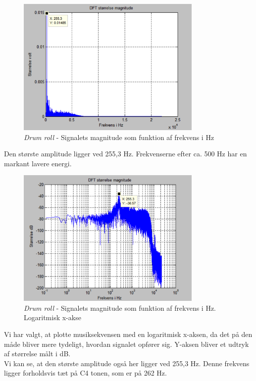 \begin{figure}[H]
	\centering
	\includegraphics[width=0.8\textwidth]{Figurer/Snip20151001_14}
	\caption{\textit{Drum roll} - Signalets magnitude som funktion af frekvens i Hz}
\end{figure}

 Den største amplitude ligger ved 255,3 Hz. Frekvenserne efter ca. 500 Hz har en markant lavere energi.

\begin{figure}[H]
	\centering
	\includegraphics[width=0.8\textwidth]{Figurer/Snip20151001_12}
	\caption{\textit{Drum roll} - Signalets magnitude som funktion af frekvens i Hz. Logaritmisk x-akse}
\end{figure} 

Vi har valgt, at plotte musiksekvensen med en logaritmisk x-aksen, da det på den måde bliver mere tydeligt, hvordan signalet opfører sig. Y-aksen bliver et udtryk af størrelse målt i dB. \\
Vi kan se, at den største amplitude også her ligger ved 255,3 Hz. Denne frekvens ligger forholdsvis tæt på C4 tonen, som er på 262 Hz.   

